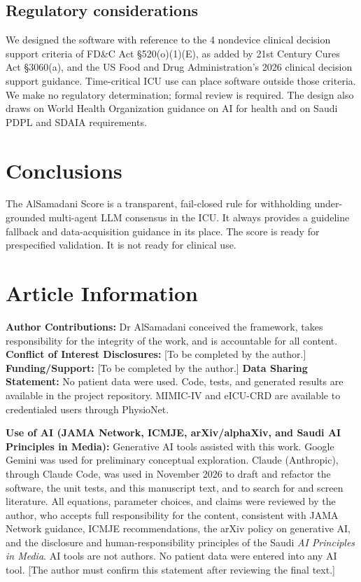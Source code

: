 \documentclass[11pt]{article}
\begin{document}
\subsection{Regulatory considerations}
We designed the software with reference to the 4 nondevice clinical decision support criteria of FD\&C Act
\S520(o)(1)(E), as added by 21st Century Cures Act \S3060(a), and the US Food and Drug Administration's 2026 clinical
decision support guidance.\cite{fdacds} Time-critical ICU use can place software outside those criteria. We make no
regulatory determination; formal review is required. The design also draws on World Health Organization guidance on
AI for health\cite{who2024} and on Saudi PDPL and SDAIA requirements.

\section{Conclusions}
The AlSamadani Score is a transparent, fail-closed rule for withholding under-grounded multi-agent LLM consensus in the
ICU. It always provides a guideline fallback and data-acquisition guidance in its place. The score is ready for
prespecified validation. It is not ready for clinical use.

\section*{Article Information}
\small
\textbf{Author Contributions:} Dr AlSamadani conceived the framework, takes responsibility for the integrity of the work, and
is accountable for all content. \textbf{Conflict of Interest Disclosures:} [To be completed by the author.]
\textbf{Funding/Support:} [To be completed by the author.]
\textbf{Data Sharing Statement:} No patient data were used. Code, tests, and generated results are available in the
project repository. MIMIC-IV and eICU-CRD are available to credentialed users through PhysioNet.

\textbf{Use of AI (JAMA Network, ICMJE, arXiv/alphaXiv, and Saudi AI Principles in Media):}
Generative AI tools assisted with this work. Google Gemini was used for preliminary conceptual exploration.
Claude (Anthropic), through Claude Code, was used in November 2026 to draft and refactor the software, the unit tests,
and this manuscript text, and to search for and screen literature. All equations, parameter choices, and claims were
reviewed by the author, who accepts full responsibility for the content, consistent with JAMA Network guidance,\cite{flanagin2024} ICMJE
recommendations,\cite{icmje} the arXiv policy on generative AI,\cite{arxivai} and the disclosure and
human-responsibility principles of the Saudi \emph{AI Principles in Media}.\cite{saudimedia} AI tools are not authors.
No patient data were entered into any AI tool. [The author must confirm this statement after reviewing the final text.]
\end{document}
